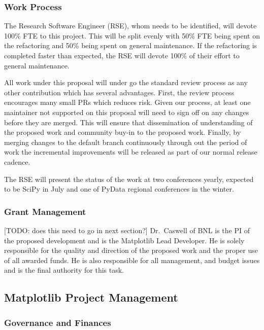 \documentclass[12pt]{article}
\numberwithin{page}{section}
\begin{document}
\subsubsection{Work Process}

The Research Software Engineer (RSE), whom needs to be identified,
will devote 100\% FTE to this project.  This will be split evenly with
50\% FTE being spent on the refactoring and 50\% being spent on
general maintenance.  If the refactoring is completed faster than
expected, the RSE will devote 100\% of their effort to general
maintenance.


All work under this proposal will under go the standard review process
as any other contribution which has several advantages.  First, the
review process encourages many small PRs which reduces risk.  Given
our process, at least one maintainer not supported on this proposal will
need to sign off on any changes before they are merged.  This will
ensure that dissemination of understanding of the proposed work and
community buy-in to the proposed work.  Finally, by merging changes to
the default branch continuously through out the period of work the
incremental improvements will be released as part of our normal
release cadence.

The RSE will present the status of the work at two conferences yearly,
expected to be SciPy in July and one of PyData regional conferences in
the winter.






\subsubsection{Grant Management}

[TODO: does this need to go in next section?]
Dr.\ Caswell of BNL is the PI of the proposed development and is the
Matplotlib Lead Developer.  He is solely responsible for the quality
and direction of the proposed work and the proper use of all awarded
funds.  He is also responsible for all management, and budget issues
and is the final authority for this task.


\subsection{Matplotlib Project Management}
\subsubsection{Governance and Finances}
\end{document}
